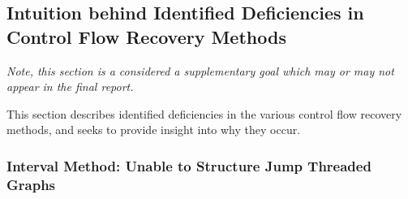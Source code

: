 
\subsection{Intuition behind Identified Deficiencies in Control Flow Recovery Methods}

\textit{Note, this section is a considered a supplementary goal which may or may not appear in the final report.}

This section describes identified deficiencies in the various control flow recovery methods, and seeks to provide insight into why they occur.



\subsubsection{Interval Method: Unable to Structure Jump Threaded Graphs}

 \\
